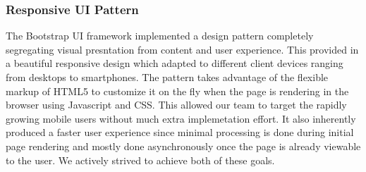 \subsubsection{Responsive UI Pattern}
The Bootstrap UI framework implemented a design pattern completely segregating visual presntation from content and user experience. This provided in a beautiful responsive design which adapted to different client devices ranging from desktops to smartphones. The pattern takes advantage of the flexible markup of HTML5 to customize it on the fly when the page is rendering in the browser using Javascript and CSS. This allowed our team to target the rapidly growing mobile users without much extra implemetation effort. It also inherently produced a faster user experience since minimal processing is done during initial page rendering and mostly done asynchronously once the page is already viewable to the user. We actively strived to achieve both of these goals.
